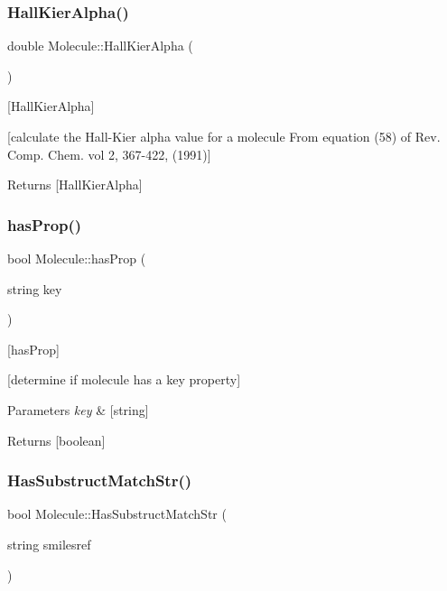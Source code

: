 \subsubsection{\texorpdfstring{Hall\+Kier\+Alpha()}{HallKierAlpha()}}
{\footnotesize\ttfamily double Molecule\+::\+Hall\+Kier\+Alpha (\begin{DoxyParamCaption}{ }\end{DoxyParamCaption})}



\mbox{[}Hall\+Kier\+Alpha\mbox{]} 

\mbox{[}calculate the Hall-\/\+Kier alpha value for a molecule From equation (58) of Rev. Comp. Chem. vol 2, 367-\/422, (1991)\mbox{]}

\begin{DoxyReturn}{Returns}
\mbox{[}Hall\+Kier\+Alpha\mbox{]} 
\end{DoxyReturn}
\mbox{\label{class_molecule_a7168f3faf1d150373c0b8728767d1d4b}} 
\subsubsection{\texorpdfstring{has\+Prop()}{hasProp()}}
{\footnotesize\ttfamily bool Molecule\+::has\+Prop (\begin{DoxyParamCaption}\item[{string}]{key }\end{DoxyParamCaption})}



\mbox{[}has\+Prop\mbox{]} 

\mbox{[}determine if molecule has a key property\mbox{]}


\begin{DoxyParams}{Parameters}
{\em key} & \mbox{[}string\mbox{]} \\
\hline
\end{DoxyParams}
\begin{DoxyReturn}{Returns}
\mbox{[}boolean\mbox{]} 
\end{DoxyReturn}
\mbox{\label{class_molecule_a5494377b1f6db28c894941c0139496b3}} 
\subsubsection{\texorpdfstring{Has\+Substruct\+Match\+Str()}{HasSubstructMatchStr()}}
{\footnotesize\ttfamily bool Molecule\+::\+Has\+Substruct\+Match\+Str (\begin{DoxyParamCaption}\item[{string}]{smilesref }\end{DoxyParamCaption})}



